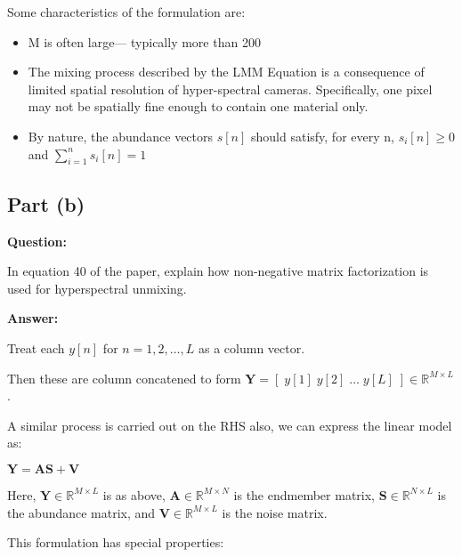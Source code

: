 \documentclass[fleqn, 11pt]{article}
\newcommand{\bs}[1]{\boldsymbol{#1}}
\newcommand{\R}[0]{\mathbb{R}}
\begin{document}
Some characteristics of the formulation are:

\begin{itemize}
    \item M is often large— typically more than 200
    \item The mixing process described by the LMM Equation is a consequence of limited spatial resolution of          hyper-spectral cameras. Specifically, one pixel may not be spatially fine enough to contain one material      only.
    \item By nature, the abundance vectors $s[n]$ should satisfy, for every n,  $s_i[n] \geq 0$ and $\sum_{i=1}^n s_i[n]=1$
\end{itemize}

\bigskip

\subsection*{Part (b)}

\textbf{Question: }

\smallskip

In equation 40 of the paper, explain how non-negative matrix factorization is used for hyperspectral unmixing.

\hrulefill

\medskip

\textbf{Answer: }

\smallskip

Treat each $y[n]$ for $n= 1,2,\ldots, L$  as a column vector. 

\smallskip

Then these are column concatened to form $\bs{Y}=[ \; y[1] \; y[2] \; \ldots \; y[L] \; ] \in \R^{M \times L}$.

\smallskip

A similar process is carried out on the RHS also, we can express the linear model as:

\begin{center}
    $\bs{Y=AS+V}$
\end{center}

Here, $\bs{Y} \in \R^{M \times L} $ is as above, 
$\bs{A} \in \R^{M \times N}$ is the endmember matrix, 
$\bs{S} \in \R^{N \times L}$ is the abundance matrix,  and 
$\bs{V} \in \R^{M \times L}$ is the noise matrix. 

\medskip

This formulation has special properties: 

\smallskip
\end{document}
